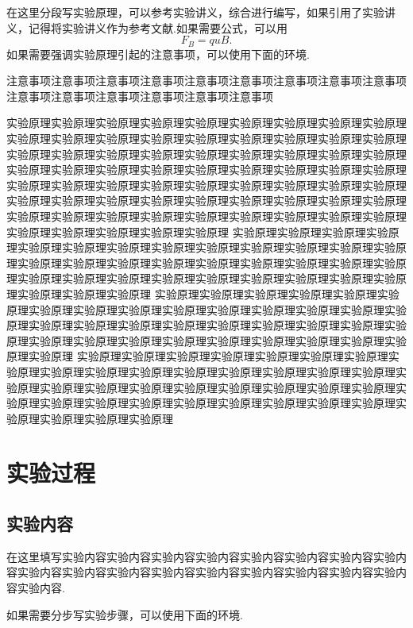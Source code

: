 \documentclass[9pt,a4paper,twoside]{../rho-class/rho}
\begin{document}
在这里分段写实验原理，可以参考实验讲义，综合进行编写，如果引用了实验讲义，记得将实验讲义作为参考文献.如果需要公式，可以用
\begin{equation}
    F_B=quB.
\end{equation}
如果需要强调实验原理引起的注意事项，可以使用下面的环境.
\begin{rhoenv}[frametitle=注意.]
    注意事项注意事项注意事项注意事项注意事项注意事项注意事项注意事项注意事项注意事项注意事项注意事项注意事项注意事项注意事项
\end{rhoenv}
实验原理实验原理实验原理实验原理实验原理实验原理实验原理实验原理实验原理实验原理实验原理实验原理实验原理实验原理实验原理实验原理实验原理实验原理实验原理实验原理实验原理实验原理实验原理实验原理实验原理实验原理实验原理实验原理实验原理实验原理实验原理实验原理实验原理实验原理实验原理实验原理实验原理实验原理实验原理实验原理实验原理实验原理实验原理实验原理实验原理实验原理实验原理实验原理实验原理实验原理实验原理实验原理实验原理实验原理实验原理实验原理实验原理实验原理实验原理实验原理实验原理实验原理实验原理实验原理实验原理实验原理实验原理实验原理
实验原理实验原理实验原理实验原理实验原理实验原理实验原理实验原理实验原理实验原理实验原理实验原理实验原理实验原理实验原理实验原理实验原理实验原理实验原理实验原理实验原理实验原理实验原理实验原理实验原理实验原理实验原理实验原理实验原理实验原理实验原理实验原理实验原理实验原理
实验原理实验原理实验原理实验原理实验原理实验原理实验原理实验原理实验原理实验原理实验原理实验原理实验原理实验原理实验原理实验原理实验原理实验原理实验原理实验原理实验原理实验原理实验原理实验原理实验原理实验原理实验原理实验原理实验原理实验原理实验原理实验原理实验原理实验原理
实验原理实验原理实验原理实验原理实验原理实验原理实验原理实验原理实验原理实验原理实验原理实验原理实验原理实验原理实验原理实验原理实验原理实验原理实验原理实验原理实验原理实验原理实验原理实验原理实验原理实验原理实验原理实验原理实验原理实验原理实验原理实验原理实验原理实验原理实验原理实验原理实验原理实验原理

\section{实验过程}
\subsection{实验内容}
在这里填写实验内容实验内容实验内容实验内容实验内容实验内容实验内容实验内容实验内容实验内容实验内容实验内容实验内容实验内容实验内容实验内容实验内容实验内容.

如果需要分步写实验步骤，可以使用下面的环境.
\end{document}
